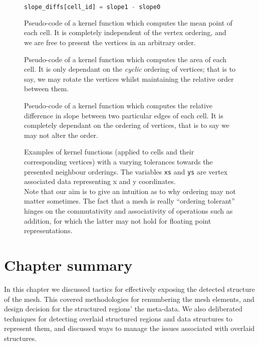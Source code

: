 \begin{figure}
\begin{lrbox}{\slopekernel}
\begin{lstlisting}[language=python]
	slope_diffs[cell_id] = slope1 - slope0
\end{lstlisting}
\end{lrbox}


\sidebysidethreeverticalnoncenter
{
	\usebox{\meankernel}
	\caption{Pseudo-code of a kernel function which computes the mean point of each cell. It is completely independent of the vertex ordering, and we are free to present the vertices in an arbitrary order.}
	\label{subfig:mean-kernel}
}
{
	\usebox{\areakernel}
	\caption{Pseudo-code of a kernel function which computes the area of each cell. It is only dependant on the \emph{cyclic} ordering of vertices; that is to say, we may rotate the vertices whilst maintaining the relative order between them.}
	\label{subfig:area-kernel}
}
{
	\usebox{\slopekernel}
	\label{subfig:slop-kernel}
	\caption{Pseudo-code of a kernel function which computes the relative difference in slope between two particular edges of each cell. It is completely dependant on the ordering of vertices, that is to say we may not alter the order.}
}
\caption{Examples of kernel functions (applied to cells and their corresponding vertices) with a varying tolerances towards the presented neighbour orderings. The variables \lstinline|xs| and \lstinline|ys| are vertex associated data representing x and y coordinates.\\Note that our aim is to give an intuition as to why ordering may not matter sometimes. The fact that a mesh is really ``ordering tolerant'' hinges on the commutativity and associativity of operations such as addition, for which the latter may not hold for floating point representations.}
\label{fig:kernel-orderings}
\end{figure}

\section{Chapter summary}
In this chapter we discussed tactics for effectively exposing the detected structure of the mesh. This covered methodologies for renumbering the mesh elements, and design decision for the structured regions' the meta-data. We also deliberated techniques for detecting overlaid structured regions and data structures to represent them, and discussed ways to manage the issues associated with overlaid structures.